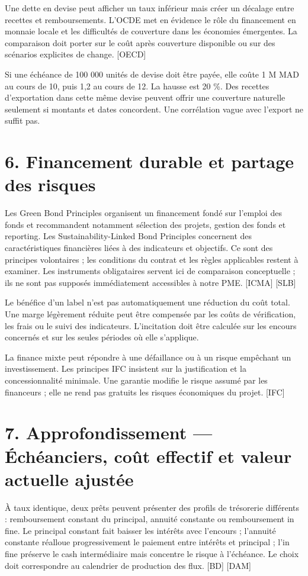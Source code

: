 \documentclass[12pt,a4paper]{article}
\begin{document}
Une dette en devise peut afficher un taux inférieur mais créer un décalage entre recettes et remboursements. L’OCDE met en évidence le rôle du financement en monnaie locale et les difficultés de couverture dans les économies émergentes. La comparaison doit porter sur le coût après couverture disponible ou sur des scénarios explicites de change. [OECD]


Si une échéance de 100 000 unités de devise doit être payée, elle coûte 1 M MAD au cours de 10, puis 1,2 au cours de 12. La hausse est 20 \%. Des recettes d’exportation dans cette même devise peuvent offrir une couverture naturelle seulement si montants et dates concordent. Une corrélation vague avec l’export ne suffit pas.

\section*{6. Financement durable et partage des risques}
Les Green Bond Principles organisent un financement fondé sur l’emploi des fonds et recommandent notamment sélection des projets, gestion des fonds et reporting. Les Sustainability-Linked Bond Principles concernent des caractéristiques financières liées à des indicateurs et objectifs. Ce sont des principes volontaires ; les conditions du contrat et les règles applicables restent à examiner. Les instruments obligataires servent ici de comparaison conceptuelle ; ils ne sont pas supposés immédiatement accessibles à notre PME. [ICMA] [SLB]


Le bénéfice d’un label n’est pas automatiquement une réduction du coût total. Une marge légèrement réduite peut être compensée par les coûts de vérification, les frais ou le suivi des indicateurs. L’incitation doit être calculée sur les encours concernés et sur les seules périodes où elle s’applique.


La finance mixte peut répondre à une défaillance ou à un risque empêchant un investissement. Les principes IFC insistent sur la justification et la concessionnalité minimale. Une garantie modifie le risque assumé par les financeurs ; elle ne rend pas gratuits les risques économiques du projet. [IFC]

\section*{7. Approfondissement --- Échéanciers, coût effectif et valeur actuelle ajustée}
À taux identique, deux prêts peuvent présenter des profils de trésorerie différents : remboursement constant du principal, annuité constante ou remboursement in fine. Le principal constant fait baisser les intérêts avec l’encours ; l’annuité constante réalloue progressivement le paiement entre intérêts et principal ; l’in fine préserve le cash intermédiaire mais concentre le risque à l’échéance. Le choix doit correspondre au calendrier de production des flux. [BD] [DAM]
\end{document}
